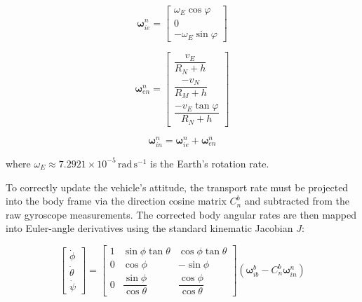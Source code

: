 \documentclass[a4paper,twoside,openany]{report}
\begin{document}
\begin{equation}
    \boldsymbol{\omega}_{ie}^n =
    \begin{bmatrix}
        \omega_E \cos\varphi \\
        0 \\
        -\omega_E \sin\varphi
    \end{bmatrix}
    \label{eq:omega_ie}
\end{equation}

\begin{equation}
    \boldsymbol{\omega}_{en}^n =
    \begin{bmatrix}
        \dfrac{v_E}{R_N + h} \\
        \dfrac{-v_N}{R_M + h} \\
        \dfrac{-v_E \tan\varphi}{R_N + h}
    \end{bmatrix}
    \label{eq:omega_en}
\end{equation}

\begin{equation}
    \boldsymbol{\omega}_{in}^n = \boldsymbol{\omega}_{ie}^n + \boldsymbol{\omega}_{en}^n
    \label{eq:omega_in}
\end{equation}

where $\omega_E \approx 7.2921 \times 10^{-5}\,\mathrm{rad\,s^{-1}}$ is the Earth's rotation rate.

To correctly update the vehicle's attitude, the transport rate must be projected into the body frame via the direction cosine matrix $C_n^b$ and subtracted from the raw gyroscope measurements. The corrected body angular rates are then mapped into Euler-angle derivatives using the standard kinematic Jacobian $J$:

\begin{equation}
    \begin{bmatrix}
        \dot{\phi} \\
        \dot{\theta} \\
        \dot{\psi}
    \end{bmatrix}
    =
    \begin{bmatrix}
        1 & \sin\phi\tan\theta & \cos\phi\tan\theta \\
        0 & \cos\phi & -\sin\phi \\
        0 & \dfrac{\sin\phi}{\cos\theta} & \dfrac{\cos\phi}{\cos\theta}
    \end{bmatrix}
    \left( \boldsymbol{\omega}_{ib}^b - C_n^b \boldsymbol{\omega}_{in}^n \right)
    \label{eq:euler_rates}
\end{equation}
\end{document}
